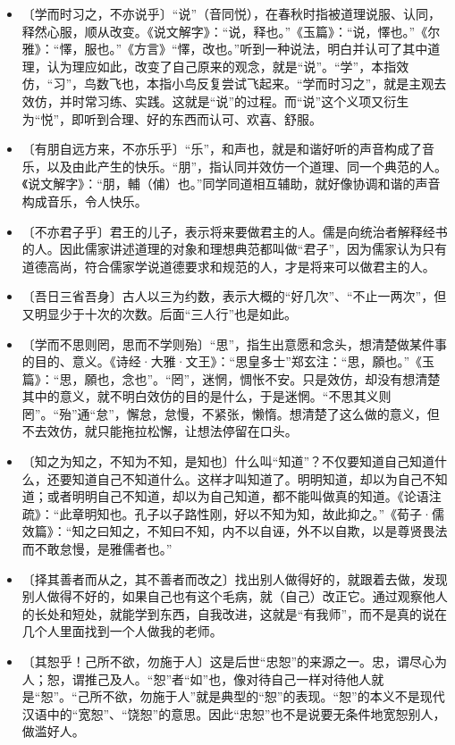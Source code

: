 \documentclass[12pt,UTF-8,openany,a4]{ctexbook}
\begin{document}
\begin{itemize}
    \setlength\itemsep{-0.2em}
    \item〔学而时习之，不亦说乎〕{\yiwen  “说”（音同悦），在春秋时指被道理说服、认同，释然心服，顺从改变。《说文解字》：“说，释也。”《玉篇》：“说，懌也。”《尔雅》：“懌，服也。”《方言》“懌，改也。”听到一种说法，明白并认可了其中道理，认为理应如此，改变了自己原来的观念，就是“说”。“学”，本指效仿，“习”，鸟数飞也，本指小鸟反复尝试飞起来。“学而时习之”，就是主观去效仿，并时常习练、实践。这就是“说”的过程。而“说”这个义项又衍生为“悦”，即听到合理、好的东西而认可、欢喜、舒服。}
    \item〔有朋自远方来，不亦乐乎〕{\yiwen “乐”，和声也，就是和谐好听的声音构成了音乐，以及由此产生的快乐。“朋”，指认同并效仿一个道理、同一个典范的人。《说文解字》：“朋，輔（俌）也。”同学同道相互辅助，就好像协调和谐的声音构成音乐，令人快乐。}
    \item〔不亦君子乎〕{\yiwen 君王的儿子，表示将来要做君主的人。儒是向统治者解释经书的人。因此儒家讲述道理的对象和理想典范都叫做“君子”，因为儒家认为只有道德高尚，符合儒家学说道德要求和规范的人，才是将来可以做君主的人。}
    \item〔吾日三省吾身〕{\yiwen 古人以三为约数，表示大概的“好几次”、“不止一两次”，但又明显少于十次的次数。后面“三人行”也是如此。}
    \item〔学而不思则罔，思而不学则殆〕{\yiwen “思”，指生出意愿和念头，想清楚做某件事的目的、意义。《诗经·大雅·文王》：“思皇多士”郑玄注：“思，願也。”《玉篇》：“思，願也，念也”。“罔”，迷惘，惆怅不安。只是效仿，却没有想清楚其中的意义，就不明白效仿的目的是什么，于是迷惘。“不思其义则罔”。“殆”通“怠”，懈怠，怠慢，不紧张，懒惰。想清楚了这么做的意义，但不去效仿，就只能拖拉松懈，让想法停留在口头。}
    \item〔知之为知之，不知为不知，是知也〕{\yiwen 什么叫“知道”？不仅要知道自己知道什么，还要知道自己不知道什么。这样才叫知道了。明明知道，却以为自己不知道；或者明明自己不知道，却以为自己知道，都不能叫做真的知道。《论语注疏》：“此章明知也。孔子以子路性刚，好以不知为知，故此抑之。”《荀子·儒效篇》：“知之曰知之，不知曰不知，内不以自诬，外不以自欺，以是尊贤畏法而不敢怠慢，是雅儒者也。”}
    \item〔择其善者而从之，其不善者而改之〕{\yiwen 找出别人做得好的，就跟着去做，发现别人做得不好的，如果自己也有这个毛病，就（自己）改正它。通过观察他人的长处和短处，就能学到东西，自我改进，这就是“有我师”，而不是真的说在几个人里面找到一个人做我的老师。}
    \item〔其恕乎！己所不欲，勿施于人〕{\yiwen 这是后世“忠恕”的来源之一。忠，谓尽心为人；恕，谓推己及人。“恕”者“如”也，像对待自己一样对待他人就是“恕”。“己所不欲，勿施于人”就是典型的“恕”的表现。“恕”的本义不是现代汉语中的“宽恕”、“饶恕”的意思。因此“忠恕”也不是说要无条件地宽恕别人，做滥好人。}
\end{itemize}
\end{document}
